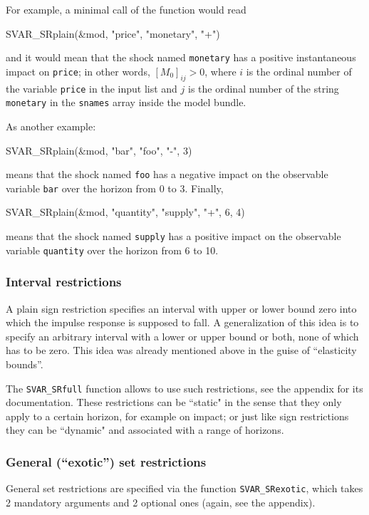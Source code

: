 \documentclass[a4paper,10pt]{article}
\begin{document}
For example, a minimal call of the function would read
\begin{code}
  SVAR_SRplain(&mod, "price", "monetary", "+")
\end{code}
and it would mean that the shock named \texttt{monetary} has a
positive instantaneous impact on \texttt{price}; in other words,
$[M_0]_{ij} > 0$, where $i$ is the ordinal number of the variable
\texttt{price} in the input list and $j$ is the ordinal number of the
string \texttt{monetary} in the \texttt{snames} array inside the model
bundle.

As another example:
\begin{code}
SVAR_SRplain(&mod, "bar", "foo", "-", 3)
\end{code}
means that the shock named \texttt{foo} has a negative impact on the
observable variable \texttt{bar} over the horizon from 0 to
3. Finally,
\begin{code}
SVAR_SRplain(&mod, "quantity", "supply", "+", 6, 4)
\end{code}
means that the shock named \texttt{supply} has a positive impact on the
observable variable \texttt{quantity} over the horizon from 6 to 10.

\subsubsection{Interval restrictions}

A plain sign restriction specifies an interval with upper or lower bound zero 
into which the impulse response is supposed to fall. A generalization of this idea is to 
specify an arbitrary interval with a lower or upper bound or both, none of which has 
to be zero. This idea was already mentioned above in the guise of ``elasticity bounds''.

The \texttt{SVAR\_SRfull} function allows to use such restrictions, see the appendix 
for its documentation. These restrictions can be ``static" in the sense that they only 
apply to a certain horizon, for example on impact; or just like sign restrictions they 
can be ``dynamic" and associated with a range of horizons. 


\subsubsection{General (``exotic'') set restrictions}

General set restrictions are specified via the function
\texttt{SVAR\_SRexotic}, which takes 2 mandatory arguments and 2 optional ones
(again, see the appendix).
\end{document}
